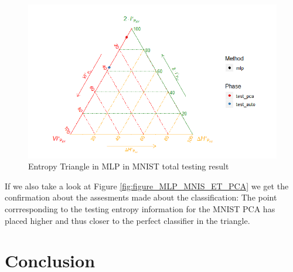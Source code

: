\documentclass[12pt]{report}
\begin{document}
\begin{figure}[H]
	\centering
	\includegraphics[width=1\linewidth]{Figuras_tfg/MNIST_performance_test}
	\caption{Entropy Triangle in MLP in MNIST total testing result}
	\label{fig:figure_MLP_MNIS_ET_Total}
\end{figure}

If we also take a look at Figure \ref{fig:figure_MLP_MNIS_ET_PCA} we get the confirmation about the assesments made about the classification: The point corrresponding to the testing entropy information for the MNIST PCA has placed higher and thus closer to the perfect classifier in the triangle. \par



\chapter{Conclusion}















\clearpage
{}

\printbibliography




\end{document}
